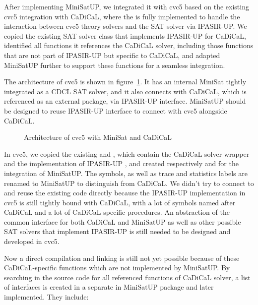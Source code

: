 After implementing MiniSatUP, we integrated it with cvc5 based on the existing cvc5 integration with CaDiCaL, where the  is fully implemented to handle the interaction between cvc5 theory solvers and the SAT solver via IPASIR-UP. We copied the existing SAT solver class that implements IPASIR-UP for CaDiCaL, identified all functions it references the CaDiCaL solver, including those functions that are not part of IPASIR-UP but specific to CaDiCaL, and adapted MiniSatUP further to support these functions for a seamless integration.

The architecture of cvc5 is shown in figure~\ref{fig:cvc5}. It has an internal MiniSat tightly integrated as a CDCL SAT solver, and it also connects with CaDiCaL, which is referenced as an external package, via IPASIR-UP interface. MiniSatUP should be designed to reuse IPASIR-UP interface to connect with cvc5 alongside CaDiCaL.

\begin{figure}[!htbp]
  \centering
  
  \caption{Architecture of cvc5 with MiniSat and CaDiCaL}
  \label{fig:cvc5}
\end{figure}

In cvc5, we copied the existing  and , which contain the CaDiCaL solver wrapper and the implementation of IPASIR-UP , and created respectively  and  for the integration of MiniSatUP. The symbols, as well as trace and statistics labels are renamed to MiniSatUP to distinguish from CaDiCaL. We didn't try to connect to and reuse the existing code directly because the IPASIR-UP implementation in cvc5 is still tightly bound with CaDiCaL, with a lot of symbols named after CaDiCaL and a lot of CaDiCaL-specific procedures. An abstraction of the common interface for both CaDiCaL and MiniSatUP as well as other possible SAT solvers that implement IPASIR-UP is still needed to be designed and developed in cvc5.

Now a direct compilation and linking is still not yet possible because of these CaDiCaL-specific functions which are not implemented by MiniSatUP. By searching in the source code for all referenced functions of CaDiCaL solver, a list of interfaces is created in a separate  in MiniSatUP package and later implemented. They include:

